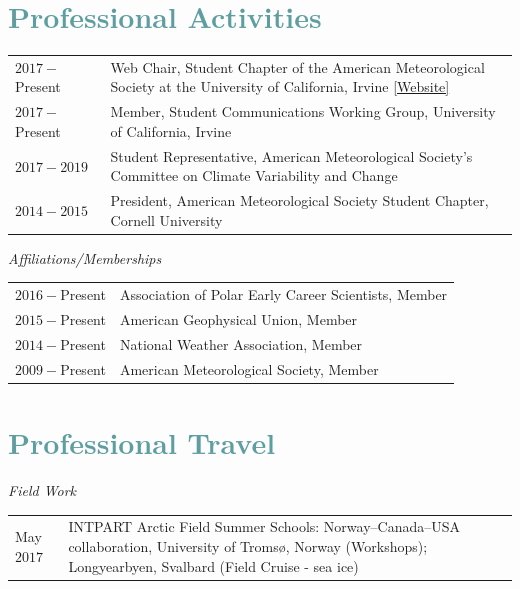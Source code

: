 \documentclass[margin,line,palatino,courier,10pt]{res}
\begin{document}
\begin{resume}
\vspace{-0.1in}
\noindent\makebox[\linewidth][r]{\rule{\textwidth}{5pt}}
\section{\sc \textcolor{CadetBlue}{\large{Professional Activities}}}
\vspace*{0.05in}
\begin{tabular}{@{}p{0.8in}p{4in}}
$2017 - $Present & Web Chair, Student Chapter of the American Meteorological Society at the University of California, Irvine \href{http://sites.uci.edu/zotcams/}{[Website]}\\
$2017 - $Present & Member, Student Communications Working Group, University of California, Irvine\\
$2017-2019$ & Student Representative, American Meteorological Society's Committee on Climate Variability and Change\\
$2014-2015$ & President, American Meteorological Society Student Chapter, Cornell University\\
\end{tabular}

\textit{Affiliations/Memberships}
\vspace*{0.05in}\\
\begin{tabular}{@{}p{0.8in}p{4in}}
$2016 - $Present & Association of Polar Early Career Scientists, Member\\ 
$2015 - $Present & American Geophysical Union, Member\\
$2014 -$Present & National Weather Association, Member\\
$2009 -$Present & American Meteorological Society, Member\\
\end{tabular}

\section{\sc \textcolor{CadetBlue}{\large{Professional Travel}}}
\textit{Field Work}
\vspace*{0.05in}\\
\begin{tabular}{@{}p{0.8in}p{4in}}
May $2017$ & INTPART Arctic Field Summer Schools: Norway--Canada--USA collaboration, University of Troms\o, Norway (Workshops); Longyearbyen, Svalbard (Field Cruise - sea ice)
\end{tabular}


\end{resume}
\end{document}
